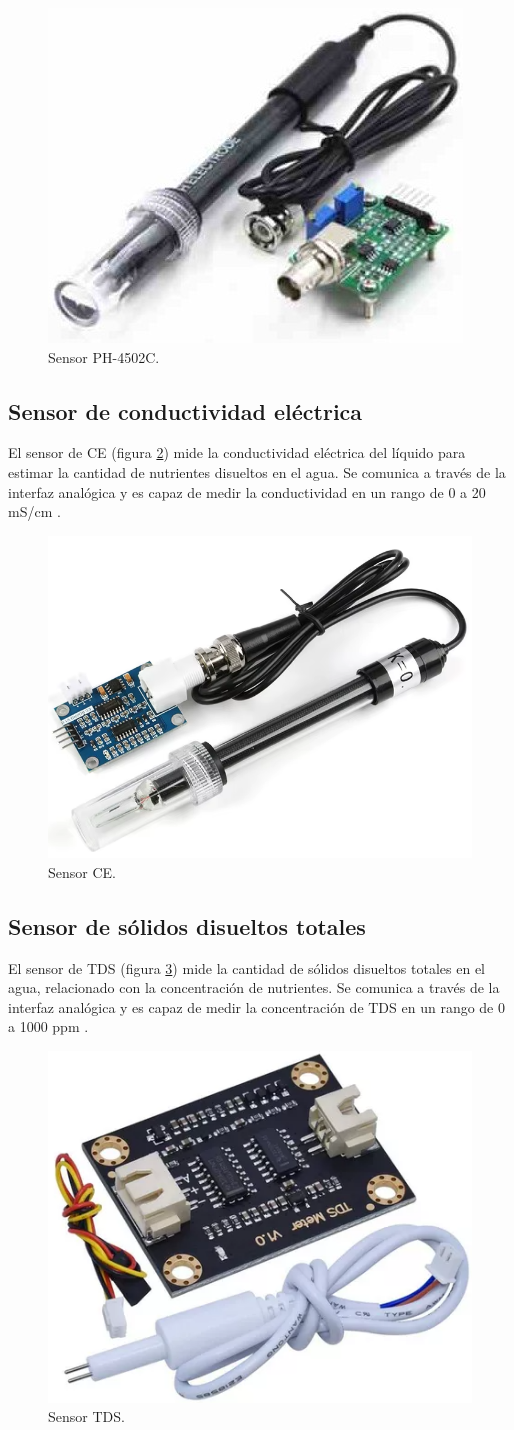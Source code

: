 \begin{figure}[H]
	\centering
	\includegraphics[width=.20\textwidth]{./Images/7.png}
	\caption{Sensor PH-4502C.}
	\label{fig:PH4502C}
\end{figure}

\subsection{Sensor de conductividad eléctrica}

El sensor de CE (figura \ref{fig:CE}) mide la conductividad eléctrica del
líquido para estimar la cantidad de nutrientes disueltos en el agua. Se
comunica a través de la interfaz analógica y es capaz de medir la conductividad
en un rango de 0 a 20 mS/cm \cite{EC-Sensor}.

\begin{figure}[H]
	\centering
	\includegraphics[width=.20\textwidth]{./Images/8.png}
	\caption{Sensor CE.}
	\label{fig:CE}
\end{figure}

\subsection{Sensor de sólidos disueltos totales}

El sensor de TDS (figura \ref{fig:TDS}) mide la cantidad de sólidos disueltos
totales en el agua, relacionado con la concentración de nutrientes. Se comunica
a través de la interfaz analógica y es capaz de medir la concentración de TDS
en un rango de 0 a 1000 ppm \cite{TDS-Sensor}.

\begin{figure}[H]
	\centering
	\includegraphics[width=.20\textwidth]{./Images/9.png}
	\caption{Sensor TDS.}
	\label{fig:TDS}
\end{figure}

